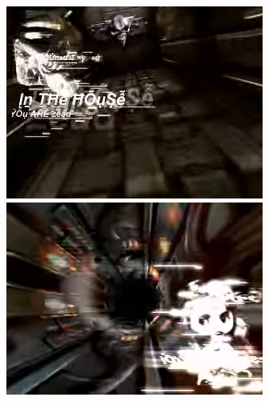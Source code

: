 \begin{figure}[h]
  \begin{minipage}[b]{0.30\linewidth}
    \centering
    \includegraphics[width=\linewidth]{images/demoscene/demos/shad1.png}
  \end{minipage}
  \hfill
  \begin{minipage}[b]{0.30\linewidth}
    \centering
    \includegraphics[width=\linewidth]{images/demoscene/demos/shad2.png}
  \end{minipage}
  \hfill
  \begin{minipage}[b]{0.30\linewidth}
    \centering

\end{minipage}
\end{figure}
